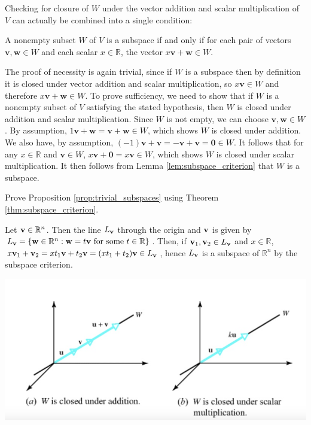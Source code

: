\documentclass[12pt,letterpaper,reqno]{article}
\numberwithin{equation}{section}
\begin{document}
Checking for closure of $W$ under the vector addition and scalar multiplication of $V$ can actually be combined into a single condition:

\begin{thm}\label{thm:subspace_criterion}
A nonempty subset $W$ of $V$ is a subspace if and only if for each pair of vectors $\mathbf{v},\mathbf{w} \in W$ and each scalar $x \in \mathbb{R}$, the vector $x\mathbf{v}+\mathbf{w} \in W$.	
\end{thm}

\begin{pf}
The proof of necessity is again trivial, since if $W$ is a subspace then by definition it is closed under vector addition and scalar multiplication, so $x\mathbf{v} \in W$ and therefore $x\mathbf{v}+\mathbf{w} \in W$. To prove sufficiency, we need to show that if $W$ is a nonempty subset of $V$ satisfying the stated hypothesis, then $W$ is closed under addition and scalar multiplication. Since $W$ is not empty, we can choose $\mathbf{v}, \mathbf{w} \in W$. By assumption, $1\mathbf{v}+\mathbf{w}=\mathbf{v}+\mathbf{w} \in W$, which shows $W$ is closed under addition. We also have, by assumption, $(-1)\mathbf{v}+\mathbf{v}=-\mathbf{v}+\mathbf{v}=\mathbf{0} \in W$. It follows that for any $x \in \mathbb{R}$ and $\mathbf{v} \in W$, $x\mathbf{v}+\mathbf{0}=x\mathbf{v}\in W$, which shows $W$ is closed under scalar multiplication. It then follows from Lemma \ref{lem:subspace_criterion} that $W$ is a subspace.	
\end{pf}

\begin{exercise}
	Prove Proposition \ref{prop:trivial_subspaces} using Theorem \ref{thm:subspace_criterion}.
\end{exercise}


\begin{example}
	Let ${\bf v} \in \mathbb{R}^n$. Then the line $L_{\bf v}$ through the origin and ${\bf v}$ is given by $L_{\bf v}=\{{\bf w} \in \mathbb{R}^n : {\bf w}=t{\bf v} \text{ for some } t \in \mathbb{R}\}$. Then, if ${\bf v}_1,{\bf v}_2 \in L_{\bf v}$ and $x \in \mathbb{R}$, $x{\bf v}_1+{\bf v}_2=xt_1{\bf v}+t_2{\bf v}=(xt_1+t_2){\bf v} \in L_{\bf v}$, hence $L_{\bf v}$ is a subspace of $\mathbb{R}^n$ by the subspace criterion. 
\end{example}	
	
\begin{center}
\includegraphics[scale=0.5]{figures_mvc/lines_through_origin}	
\end{center}
\end{document}

